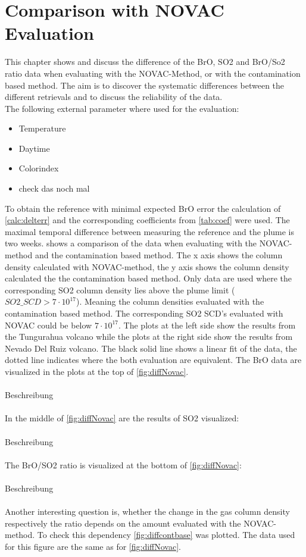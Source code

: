 \documentclass  [
  paper    = a4,
  BCOR     = 10mm,
  twoside,
  fontsize = 12pt,
  fleqn,
  toc      = bibnumbered,
  toc      = listofnumbered,
  numbers  = noendperiod,
  headings = normal,
  listof   = leveldown,
  version  = 3.03
]                                       {scrreprt}
\begin{document}
	\chapter{Comparison with NOVAC Evaluation}
	This chapter shows and discuss the difference of the BrO, SO2 and BrO/So2 ratio data when evaluating with the NOVAC-Method, or with the contamination based method.
	The aim is to discover the systematic differences between the different retrievals and to discuss the reliability of the data.\\
	The following external parameter where used for the evaluation:
	\begin{itemize}
		\item Temperature
		\item Daytime
		\item Colorindex
		\item check das noch mal
	\end{itemize}
	To obtain the reference with minimal expected  BrO error the calculation of \cref{calc:delterr} and the corresponding coefficients from \cref{tab:coef} were used. The maximal temporal difference between measuring the reference and the plume is two weeks.
	 shows a comparison of the data when evaluating with the NOVAC-method and the contamination based method. The x axis shows the column density calculated with NOVAC-method, the y axis shows the column density calculated the the contamination based method. Only data are used where the corresponding SO2 column density lies above the plume limit ($SO2\_SCD>7\cdot 10^{17}$). Meaning the column densities evaluated with the contamination based method. The corresponding SO2 SCD's evaluated with NOVAC could be below $7\cdot 10^{17}$.
	The plots at the left side show the results from the Tungurahua volcano while the plots at the right side show the results from Nevado Del Ruiz volcano. The black solid line shows a linear fit of the data, the dotted line indicates where the both evaluation are equivalent. The BrO data are visualized in the plots at the top of \cref{fig:diffNovac}. \\
	\\
	Beschreibung\\
	\\
	In the middle of \cref{fig:diffNovac} are the results of SO2 visualized:\\
	\\
	Beschreibung\\
	\\
	The BrO/SO2 ratio is visualized at the bottom of \cref{fig:diffNovac}:\\
	\\
	Beschreibung\\
	\\
	Another interesting question is, whether the change in the gas column density respectively the ratio depends on the amount evaluated with the NOVAC-method. To check this dependency \cref{fig:diffcontbase} was plotted. The data used for this figure are the same as for \cref{fig:diffNovac}. 
	
\end{document}
